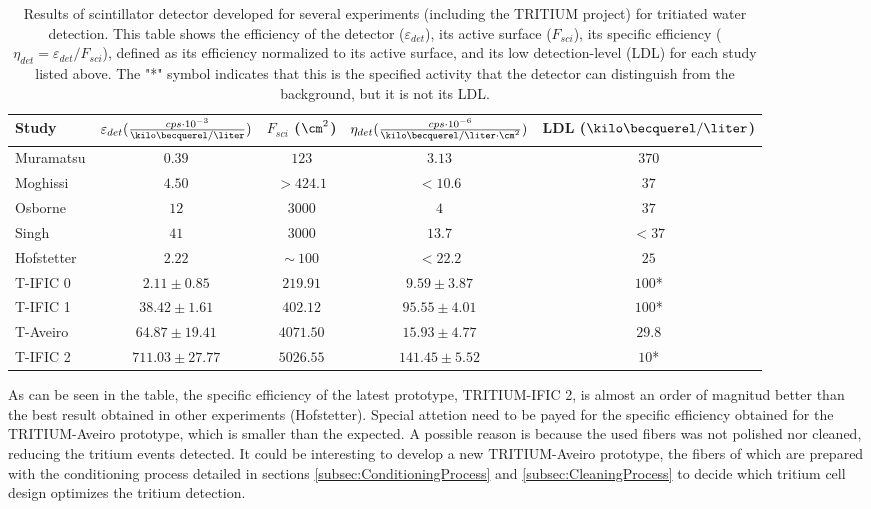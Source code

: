 \begin{table}[htbp]
\centering{}%
\begin{tabular}{lcccc}
\toprule 
Study & \parbox{5.5em}{$\varepsilon_{det}(\frac{cps \cdot{} 10^{-3}}{\kilo\becquerel/\liter})$}  & \parbox{4.5em}{$F_{sci}$ ($\cm^2$)}  & \parbox{6.5em}{$\eta_{det}(\frac{cps \cdot{} 10^{-6}}{\kilo\becquerel/ \liter \cdot{} \cm^2})$} & LDL ($\kilo\becquerel / \liter$) \tabularnewline
\midrule
\midrule 
Muramatsu & $0.39$ & $123$ & $3.13$ & $370$ \tabularnewline
Moghissi & $4.50$ & $>424.1$ & $<10.6$ & $37$ \tabularnewline
Osborne & $12$ & $3000$ & $4$ & $37$ \tabularnewline
Singh & $41$ & $3000$ & $13.7$ & $<37$ \tabularnewline
Hofstetter & $2.22$ & $\sim~100$ & $<22.2$ & $25$ \tabularnewline
T-IFIC 0 & $2.11 \pm 0.85$ & $219.91$ & $9.59 \pm 3.87$ & $100$* \tabularnewline
T-IFIC 1 & $38.42 \pm 1.61$ & $402.12$ & $95.55 \pm 4.01$ & $100$* \tabularnewline
T-Aveiro & $64.87 \pm 19.41$ & $4071.50$ & $15.93 \pm 4.77$ & $29.8$ \tabularnewline
T-IFIC 2 & $711.03 \pm 27.77$ & $5026.55$ & $141.45 \pm 5.52$ & $10$* \tabularnewline
\bottomrule
\end{tabular}
\caption{Results of scintillator detector developed for several experiments (including the TRITIUM project) for tritiated water detection. This table shows the efficiency of the detector ($\varepsilon_{det}$), its active surface ($F_{sci}$), its specific efficiency ($\eta_{det}=\varepsilon_{det}/F_{sci}$), defined as its efficiency normalized to its active surface, and its low detection-level (LDL) for each study listed above. The "*" symbol indicates that this is the specified activity that the detector can distinguish from the background, but it is not its LDL.}
\label{tab:ComparisonResultsTri}
\end{table}

As can be seen in the table, the specific efficiency of the latest prototype, TRITIUM-IFIC 2, is almost an order of magnitud better than the best result obtained in other experiments (Hofstetter). Special attetion need to be payed for the specific efficiency obtained for the TRITIUM-Aveiro prototype, which is smaller than the expected. A possible reason is because the used fibers was not polished nor cleaned, reducing the tritium events detected. It could be interesting to develop a new TRITIUM-Aveiro prototype, the fibers of which are prepared with the conditioning process detailed in sections \ref{subsec:ConditioningProcess} and \ref{subsec:CleaningProcess} to decide which tritium cell design optimizes the tritium detection. 

